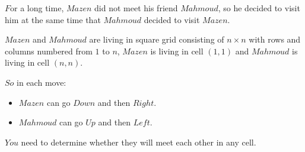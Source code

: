 $F$or a long time, $Mazen$ did not meet his friend $Mahmoud$, so he decided to visit him at the same time that $Mahmoud$ decided to visit $Mazen$.

$Mazen$ and $Mahmoud$ are living in square grid consisting of $n \times n$ with rows and columns numbered from $1$ to $n$, $Mazen$ is living in cell $(1,1)$ and $Mahmoud$ is living in cell $(n,n)$.

$So$ in each move:
\begin{itemize}
  \item $Mazen$ can go $Down$ and then $Right$.
  \item $Mahmoud$ can go $Up$ and then $Left$.
\end{itemize}

$You$ need to determine whether they will meet each other in any cell.
